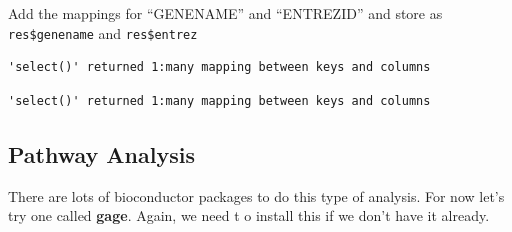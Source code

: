 \documentclass[
  letterpaper,
  DIV=11,
  numbers=noendperiod]{scrartcl}
\newenvironment{Shaded}{\begin{snugshade}}{\end{snugshade}}
\newcommand{\AttributeTok}[1]{\textcolor[rgb]{0.40,0.45,0.13}{#1}}
\newcommand{\CommentTok}[1]{\textcolor[rgb]{0.37,0.37,0.37}{#1}}
\newcommand{\FunctionTok}[1]{\textcolor[rgb]{0.28,0.35,0.67}{#1}}
\newcommand{\NormalTok}[1]{\textcolor[rgb]{0.00,0.23,0.31}{#1}}
\newcommand{\OtherTok}[1]{\textcolor[rgb]{0.00,0.23,0.31}{#1}}
\newcommand{\SpecialCharTok}[1]{\textcolor[rgb]{0.37,0.37,0.37}{#1}}
\newcommand{\StringTok}[1]{\textcolor[rgb]{0.13,0.47,0.30}{#1}}
\begin{document}
Add the mappings for ``GENENAME'' and ``ENTREZID'' and store as
\texttt{res\$genename} and \texttt{res\$entrez}

\begin{Shaded}
\end{Shaded}

\begin{verbatim}
'select()' returned 1:many mapping between keys and columns
\end{verbatim}

\begin{Shaded}
\end{Shaded}

\begin{verbatim}
'select()' returned 1:many mapping between keys and columns
\end{verbatim}

\subsection{Pathway Analysis}\label{pathway-analysis}

There are lots of bioconductor packages to do this type of analysis. For
now let's try one called \textbf{gage}. Again, we need t o install this
if we don't have it already.
\end{document}
